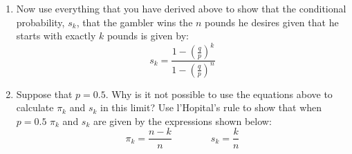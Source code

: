 \documentclass[paper=a4, fontsize=11pt]{scrartcl}
\numberwithin{equation}{section}
\numberwithin{figure}{section}
\numberwithin{table}{section}
\begin{document}
\begin{enumerate}
\item Now use everything that you have derived above to show that the conditional probability, $s_k$, that the gambler wins the $n$ pounds he desires given that he starts with exactly $k$ pounds is 
given by:
$$
s_k = \frac{ 1 - \left( \frac{q}{p} \right)^k }{ 1 - \left( \frac{q}{p} \right)^n }
$$

\item Suppose that $p=0.5$.  Why is it not possible to use the equations above to calculate $\pi_k$ and $s_k$ in this limit?  Use l'Hopital's rule to show that when $p=0.5$ $\pi_k$ and 
$s_k$ are given by the expressions shown below:
$$
\pi_k = \frac{ n-k }{n } \qquad \qquad s_k = \frac{ k}{n} 
$$

\end{enumerate}
\end{document}
